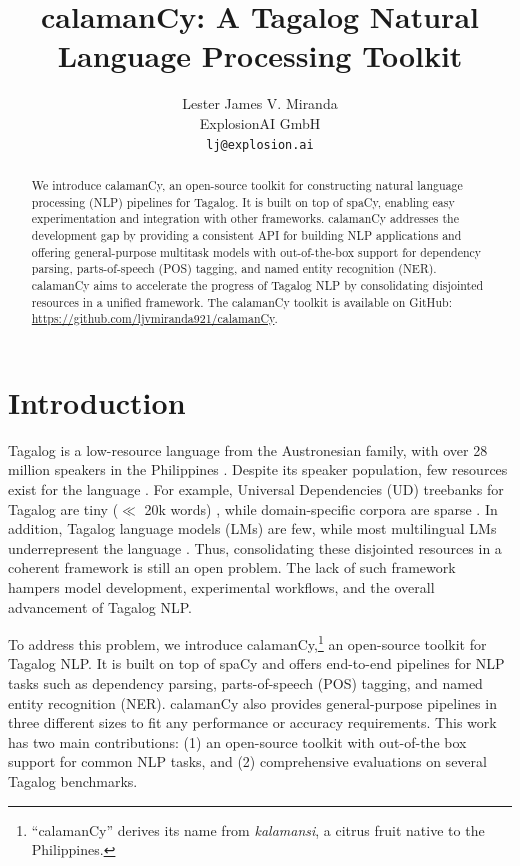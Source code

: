 \documentclass[11pt]{article}
\title{calamanCy: A Tagalog Natural Language Processing Toolkit}
\author{Lester James V. Miranda \\
  ExplosionAI GmbH \\
  \texttt{lj@explosion.ai}}
\begin{document}
\maketitle
\begin{abstract}
  We introduce calamanCy, an open-source toolkit for constructing natural language processing (NLP) pipelines for Tagalog.
  It is built on top of spaCy, enabling easy experimentation and integration with other frameworks.  
  calamanCy addresses the development gap by providing a consistent API for building NLP applications and offering general-purpose multitask models with out-of-the-box support for dependency parsing, parts-of-speech (POS) tagging, and named entity recognition (NER).
  calamanCy aims to accelerate the progress of Tagalog NLP by consolidating disjointed resources in a unified framework.
  The calamanCy toolkit is available on GitHub: \url{https://github.com/ljvmiranda921/calamanCy}.
\end{abstract}

\section{Introduction}

Tagalog is a low-resource language from the Austronesian family, with over 28 million speakers in the Philippines \citep{Lewis2009EthnologueL}.
Despite its speaker population, few resources exist for the language \citep{Cruz2021ImprovingLL}. 
For example, Universal Dependencies (UD) treebanks for Tagalog are tiny ($\ll$ 20k words) \citep{Samson2018TRG,Aquino2020ParsingIT}, 
while domain-specific corpora are sparse \citep{Cabasag2016HatespeechIP,Livelo2018IntelligentDI}. 
In addition, Tagalog language models (LMs) \citep{Cruz2021ImprovingLL,Jiang2021PretrainedLM} are few, while most multilingual LMs \citep{Conneau2019UnsupervisedCR,Devlin2019BERTPO} underrepresent the language \citep{Lauscher2020FromZT}.
Thus, consolidating these disjointed resources in a coherent framework is still an open problem.
The lack of such framework hampers model development, experimental workflows, and the overall advancement of Tagalog NLP.

To address this problem, we introduce calamanCy,\footnote[1]{
  ``calamanCy'' derives its name from \textit{kalamansi}, a citrus fruit native to the Philippines.}
an open-source toolkit for Tagalog NLP. 
It is built on top of spaCy \citep{Honnibal2020Spacy} and offers end-to-end pipelines for NLP tasks such as dependency parsing, parts-of-speech (POS) tagging, and named entity recognition (NER). 
calamanCy also provides general-purpose pipelines in three different sizes to fit any performance or accuracy requirements.
This work has two main contributions: (1) an open-source toolkit with out-of-the box support for common NLP tasks, and (2) comprehensive evaluations on several Tagalog benchmarks.
\end{document}
